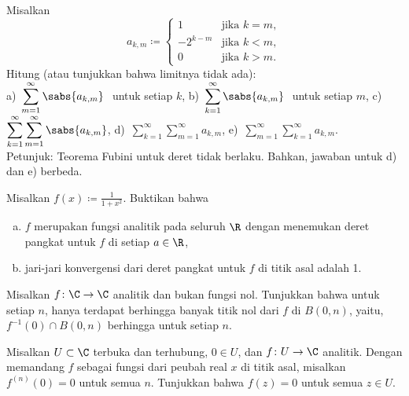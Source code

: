 \begin{exercise}
Misalkan
\begin{equation*}
a_{k,m} \coloneqq
\begin{cases}
1        & \text{jika } k=m,\\
-2^{k-m} & \text{jika } k<m,\\
0        & \text{jika } k>m.
\end{cases}
\end{equation*}
Hitung (atau tunjukkan bahwa limitnya tidak ada):
\\
a)~$\displaystyle \sum_{m=1}^\infty \sabs{a_{k,m}}~$ untuk setiap $k$,
\hspace{\fill}
b)~$\displaystyle \sum_{k=1}^\infty \sabs{a_{k,m}}~$ untuk setiap $m$,
\hspace{\fill}
c)~$\displaystyle \sum_{k=1}^\infty \sum_{m=1}^\infty \sabs{a_{k,m}}$,
\hspace{\fill}
d)~$\displaystyle \sum_{k=1}^\infty \sum_{m=1}^\infty a_{k,m}$,
\hspace{\fill}
e)~$\displaystyle \sum_{m=1}^\infty \sum_{k=1}^\infty a_{k,m}$.
\\
Petunjuk: Teorema Fubini untuk deret tidak berlaku.
Bahkan, jawaban untuk d) dan e) berbeda.
\end{exercise}

\begin{exercise}
\pagebreak[2]
Misalkan $f(x) \coloneqq \frac{1}{1+x^2}$.  Buktikan bahwa
\begin{enumerate}[a)]
\item
$f$ merupakan fungsi analitik pada seluruh $\R$
dengan menemukan deret pangkat untuk $f$ di setiap $a \in \R$,
\item
jari-jari konvergensi dari
deret pangkat untuk $f$ di titik asal adalah 1.
\end{enumerate}
\end{exercise}


\begin{exercise}
\pagebreak[2]
Misalkan $f \colon \C \to \C$ analitik dan bukan fungsi nol.  Tunjukkan bahwa untuk setiap
$n$, hanya terdapat berhingga banyak titik nol dari $f$ di $B(0,n)$, yaitu,
$f^{-1}(0) \cap B(0,n)$ berhingga untuk setiap $n$.
\end{exercise}

\begin{exercise}
Misalkan $U \subset \C$ terbuka dan terhubung, $0 \in U$, dan $f \colon U
\to \C$ analitik.  Dengan memandang $f$ sebagai fungsi dari peubah real $x$
di titik asal, misalkan $f^{(n)}(0) = 0$ untuk semua $n$.  Tunjukkan bahwa $f(z) = 0$
untuk semua $z \in U$.
\end{exercise}

